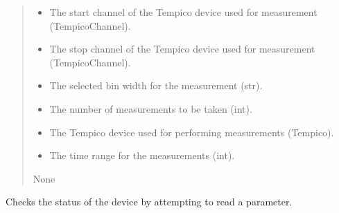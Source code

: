 \documentclass[letterpaper,10pt,english]{sphinxmanual}
\begin{document}
\begin{fulllineitems}
\begin{description}
\begin{itemize}
\end{itemize}

\end{description}
\begin{quote}\begin{description}
\begin{itemize}
\item {} 
\sphinxAtStartPar
{} \textendash{} The start channel of the Tempico device used for measurement (TempicoChannel).

\item {} 
\sphinxAtStartPar
{} \textendash{} The stop channel of the Tempico device used for measurement (TempicoChannel).

\item {} 
\sphinxAtStartPar
{} \textendash{} The selected bin width for the measurement (str).

\item {} 
\sphinxAtStartPar
{} \textendash{} The number of measurements to be taken (int).

\item {} 
\sphinxAtStartPar
{} \textendash{} The Tempico device used for performing measurements (Tempico).

\item {} 
\sphinxAtStartPar
{} \textendash{} The time range for the measurements (int).

\end{itemize}

\sphinxAtStartPar
None

\end{description}\end{quote}

\begin{fulllineitems}
\label{\detokenize{FLIMGraphics:FLIMGraphics.WorkerThreadFLIM.checkDeviceStatus}}
\pysigstartsignatures
{}
\pysigstopsignatures
\sphinxAtStartPar
Checks the status of the device by attempting to read a parameter.


\end{fulllineitems}
\end{fulllineitems}
\end{document}
